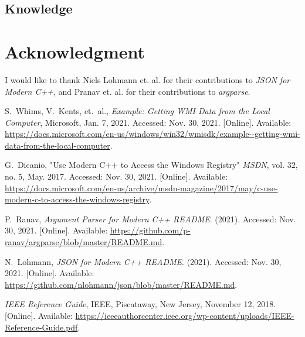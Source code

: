 \documentclass[conference]{IEEEtran}
\begin{document}
\subsection{Knowledge}

\section*{Acknowledgment}

I would like to thank Niels Lohmann et. al. for their contributions to \textit{JSON for Modern C++},
and Pranav et. al. for their contributions to \textit{argparse}.

\newpage

\begin{thebibliography}{2}

S.~Whims, V.~Kents, et.~al., \textit{Example: Getting WMI Data from the Local Computer}, Microsoft, Jan. 7, 2021. Accessed: Nov. 30, 2021. [Online]. Available: \url{https://docs.microsoft.com/en-us/windows/win32/wmisdk/example--getting-wmi-data-from-the-local-computer}.

G.~Dicanio, "Use Modern C++ to Access the Windows Registry" \textit{MSDN}, vol. 32, no. 5, May. 2017. Accessed: Nov. 30, 2021. [Online]. Available: \url{https://docs.microsoft.com/en-us/archive/msdn-magazine/2017/may/c-use-modern-c-to-access-the-windows-registry}.

P.~Ranav, \textit{Argument Parser for Modern C++ README}. (2021). Accessed: Nov. 30, 2021. [Online]. Available: \url{https://github.com/p-ranav/argparse/blob/master/README.md}.

N.~Lohmann, \textit{JSON for Modern C++ README}. (2021). Accessed: Nov. 30, 2021. [Online]. Available: \url{https://github.com/nlohmann/json/blob/master/README.md}.

\textit{IEEE Reference Guide}, IEEE, Piscataway, New Jersey, November 12, 2018. [Online]. Available: \url{https://ieeeauthorcenter.ieee.org/wp-content/uploads/IEEE-Reference-Guide.pdf}.

\end{thebibliography}
\end{document}
